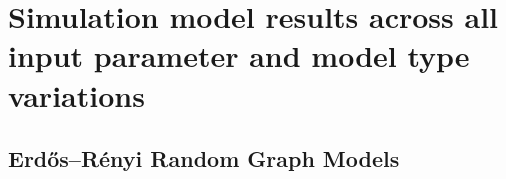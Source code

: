 \documentclass{article}
\theoremstyle{definition}
\begin{document}

\newpage
\section{Simulation model results across all input parameter and model type variations}
\label{Appendix 4}

\subsection{Erdős–Rényi  Random Graph Models}
\end{document}
